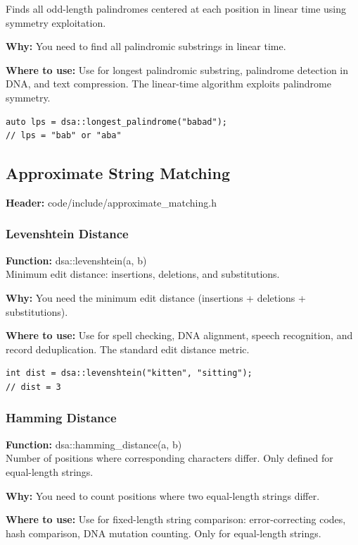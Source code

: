 \documentclass[11pt]{article}
\begin{document}
Finds all odd-length palindromes centered at each position in linear time using symmetry exploitation.

\textbf{Why:} You need to find all palindromic substrings in linear time. \par \textbf{Where to use:} Use for longest palindromic substring, palindrome detection in DNA, and text compression. The linear-time algorithm exploits palindrome symmetry.

\begin{lstlisting}
auto lps = dsa::longest_palindrome("babad");
// lps = "bab" or "aba"
\end{lstlisting}

\subsection{Approximate String Matching}
\textbf{Header:} code/include/approximate\_matching.h

\subsubsection{Levenshtein Distance}
\textbf{Function:} dsa::levenshtein(a, b)\\

Minimum edit distance: insertions, deletions, and substitutions.

\textbf{Why:} You need the minimum edit distance (insertions + deletions + substitutions). \par \textbf{Where to use:} Use for spell checking, DNA alignment, speech recognition, and record deduplication. The standard edit distance metric.

\begin{lstlisting}
int dist = dsa::levenshtein("kitten", "sitting");
// dist = 3
\end{lstlisting}

\subsubsection{Hamming Distance}
\textbf{Function:} dsa::hamming\_distance(a, b)\\

Number of positions where corresponding characters differ. Only defined for equal-length strings.

\textbf{Why:} You need to count positions where two equal-length strings differ. \par \textbf{Where to use:} Use for fixed-length string comparison: error-correcting codes, hash comparison, DNA mutation counting. Only for equal-length strings.
\end{document}
